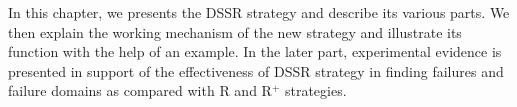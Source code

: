 In this chapter, we presents the DSSR strategy and describe its various parts. We then explain the working mechanism of the new strategy and illustrate its function with the help of an example. In the later part,  experimental evidence is presented in support of the effectiveness of DSSR strategy in finding failures and failure domains as compared with R and R$^+$ strategies.










